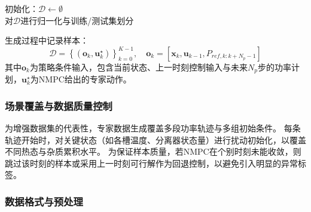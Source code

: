 \begin{algorithm}[htb]
  \caption{NMPC专家数据生成}
  \label{algo:expert_data_generation}
  \SetAlgoLined
  初始化：$\mathcal{D} \leftarrow \emptyset$\\
  对$\mathcal{D}$进行归一化与训练/测试集划分\\
\end{algorithm}

生成过程中记录样本：
\begin{equation}
  \mathcal{D} = \left\{(\mathbf{o}_k, \mathbf{u}_k^\star)\right\}_{k=0}^{K-1}, \quad \mathbf{o}_k = [\mathbf{x}_k, \mathbf{u}_{k-1}, P_{ref,k:k+N_p-1}]
\end{equation}
其中$\mathbf{o}_k$为策略条件输入，包含当前状态、上一时刻控制输入与未来$N_p$步的功率计划，$\mathbf{u}_k^\star$为NMPC给出的专家动作。

\subsubsection{场景覆盖与数据质量控制}

为增强数据集的代表性，专家数据生成覆盖多段功率轨迹与多组初始条件。
每条轨迹开始时，对关键状态（如各槽温度、分离器状态量）进行扰动初始化，以覆盖不同热态与杂质累积水平。
为保证样本质量，若NMPC在个别时刻未能收敛，则跳过该时刻的样本或采用上一时刻可行解作为回退控制，以避免引入明显的异常标签。

\subsubsection{数据格式与预处理}

